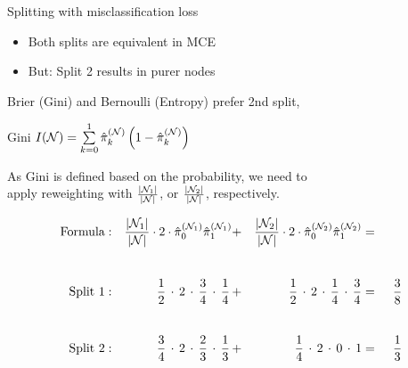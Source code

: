 \documentclass[11pt,compress,t,notes=noshow, xcolor=table]{beamer}
\begin{document}
\begin{vbframe}{Splitting with misclassification loss}
\lz

\begin{itemize}
\item Both splits are equivalent in MCE
\item But: Split 2 results in purer nodes
\end{itemize}

\framebreak


Brier (Gini) and Bernoulli (Entropy) prefer 2nd split, \\
\vspace{0.1cm}

Gini $I(\Np) = \sum \limits_{k = 0}^1 \pikNh \left( 1-\pikNh \right)$

\vspace{0.1cm}
As Gini is defined based on the probability, we need to \\
\vspace{0.05cm}
apply reweighting with $\frac{|\Nl|}{|\Np|}$, or $\frac{|\Nr|}{|\Np|}$, respectively.

\begin{alignat*}{6}
\text{Formula}&:& \frac{|\Nl|}{|\Np|}\cdot 2 \cdot\pikNlh[0]\pikNlh[1] &+& \frac{|\Nr|}{|\Np|}\cdot 2 \cdot \pikNrh[0]\pikNrh[1] &=& \\[5ex]
\text{Split 1}&:& \,\, \frac{1}{2} \,\cdot \, 2 \,\cdot\, \frac{3}{4} \,\cdot\, \frac{1}{4} \,&+&\,  \, \frac{1}{2} \,\cdot\, 2 \, \cdot\, \frac{1}{4} \,\cdot\, \frac{3}{4} &=&\;\, \frac{3}{8}\\[5ex]
\text{Split 2}&:& \frac{3}{4}\, \cdot\, 2 \,\cdot\,\frac{2}{3}\,\cdot\,\frac{1}{3}\, &+& \frac{1}{4} \,\cdot\, 2 \,\cdot\, 0 \,\cdot\, 1 &=&\; \,\frac{1}{3}
\end{alignat*}
\end{vbframe}




\endlecture
\end{document}
